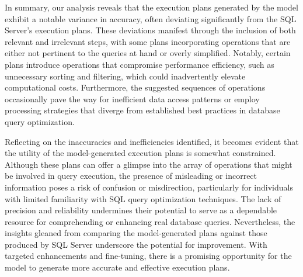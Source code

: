 In summary, our analysis reveals that the execution plans generated by the model exhibit a notable variance in accuracy, often deviating significantly from the SQL Server's execution plans. These deviations manifest through the inclusion of both relevant and irrelevant steps, with some plans incorporating operations that are either not pertinent to the queries at hand or overly simplified. Notably, certain plans introduce operations that compromise performance efficiency, such as unnecessary sorting and filtering, which could inadvertently elevate computational costs. Furthermore, the suggested sequences of operations occasionally pave the way for inefficient data access patterns or employ processing strategies that diverge from established best practices in database query optimization.

Reflecting on the inaccuracies and inefficiencies identified, it becomes evident that the utility of the model-generated execution plans is somewhat constrained. Although these plans can offer a glimpse into the array of operations that might be involved in query execution, the presence of misleading or incorrect information poses a risk of confusion or misdirection, particularly for individuals with limited familiarity with SQL query optimization techniques. The lack of precision and reliability undermines their potential to serve as a dependable resource for comprehending or enhancing real database queries. Nevertheless, the insights gleaned from comparing the model-generated plans against those produced by SQL Server underscore the potential for improvement. With targeted enhancements and fine-tuning, there is a promising opportunity for the model to generate more accurate and effective execution plans.

